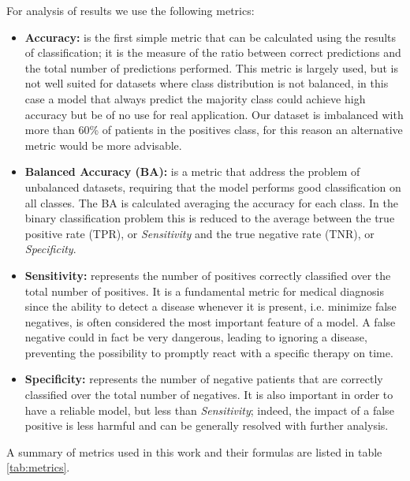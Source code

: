 For analysis of results we use the following metrics:
\begin{itemize}
    \item \textbf{Accuracy:} is the first simple metric that can be calculated using the results of classification; it is the measure of the ratio between correct predictions and the total number of predictions performed.
    This metric is largely used, but is not well suited for datasets where class distribution is not balanced, in this case a model that always predict the majority class could achieve high accuracy but be of no use for real application.
    Our dataset is imbalanced with more than 60\% of patients in the positives class, for this reason an alternative metric would be more advisable.
    \item \textbf{Balanced Accuracy (BA):} is a metric that address the problem of unbalanced datasets, requiring that the model performs good classification on all classes.
    The BA is calculated averaging the accuracy for each class.
    In the binary classification problem this is reduced to the average between the true positive rate (TPR), or \emph{Sensitivity} and the true negative rate (TNR), or \emph{Specificity}.
    \item \textbf{Sensitivity:} represents the number of positives correctly classified over the total number of positives.
    It is a fundamental metric for medical diagnosis since the ability to detect a disease whenever it is present, i.e. minimize false negatives, is often considered the most important feature of a model.
    A false negative could in fact be very dangerous, leading to ignoring a disease, preventing the possibility to promptly react with a specific therapy on time.
    \item \textbf{Specificity:} represents the number of negative patients that are correctly classified over the total number of negatives.
    It is also important in order to have a reliable model, but less than \emph{Sensitivity}; indeed, the impact of a false positive is less harmful and can be generally resolved with further analysis.
\end{itemize}

A summary of metrics used in this work and their formulas are listed in table \ref{tab:metrics}.

